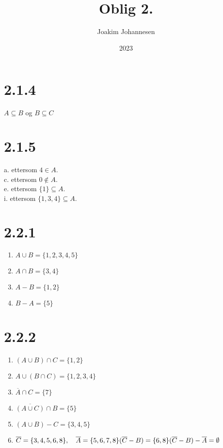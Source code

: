 \documentclass[12pt, a4paper]{article}
\title{Oblig 2.}
\author{Joakim Johannesen}
\date{2023}
\begin{document}
\maketitle

 \section*{2.1.4}
   $A \subseteq B$ og $B \subseteq C$

 \section*{2.1.5}
   a. ettersom $ 4\in A$.\\
   c. ettersom $ 0\notin A$.\\
   e. ettersom $ \{1\} \subseteq A$.\\
   i. ettersom $ \{1,3,4\} \subseteq A$.
   
 \section*{2.2.1}
   \begin{enumerate} [label=\alph*.]
      \item $ A \cup B = \{1,2,3,4,5\} $
      \item $ A \cap B = \{3,4\} $
      \item $ A - B = \{1,2\} $
      \item $ B - A = \{5\} $
   \end{enumerate}

\newpage 

 \section*{2.2.2}
   \begin{enumerate} [label=\alph*.]
      \item $ (A\cup B)\cap C = \{1,2\} $
      \item $ A\cup (B\cap C) = \{1,2,3,4\} $
      \item $ {\overline{A}} \cap C = \{7\} $
      \item $ {\overline{(A\cup C)}} \cap B = \{5\} $
      \item $ (A\cup B) - C = \{3,4,5\} $
      \item $ \overline{C} = \{3,4,5,6,8\} ,\quad \overline{A} = \{5,6,7,8\}\\
      (\overline{C}-B) = \{6,8\}\\
      (\overline{C}-B) - \overline{A} = \emptyset $
   \end{enumerate}
\end{document}
